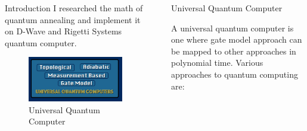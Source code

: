 \documentclass[final]{beamer}
\newlength{\sepwid}
\newlength{\onecolwid}
\newlength{\twocolwid}
\begin{document}
\begin{frame}[t]
\begin{columns}[t]
\begin{column}{\onecolwid}
\begin{block}{Introduction}
    I researched the math of quantum annealing and implement it on D-Wave and Rigetti Systems quantum computer.

\end{block}


\begin{figure}
\includegraphics[width=0.8\linewidth]{uqc.png}
\caption{Universal Quantum Computer}
\end{figure}


\end{column} %

\begin{column}{\sepwid}\end{column} %

\begin{column}{\twocolwid} %

\begin{columns}[t,totalwidth=\twocolwid] %

\begin{column}{\onecolwid}\vspace{-.6in} %


\begin{block}{Universal Quantum Computer}

A universal quantum computer is one where gate model approach can be mapped to other approaches in polynomial time. Various approaches to quantum computing are:


\end{block}
\end{column}
\end{columns}
\end{column}
\end{columns}
\end{frame}
\end{document}
